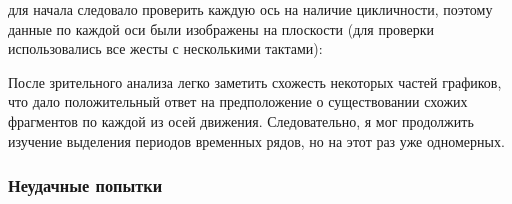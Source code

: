 для начала следовало проверить каждую ось на наличие цикличности, поэтому данные по каждой оси были изображены на плоскости (для проверки использовались все жесты с несколькими тактами):
\begin{figure}[H]
\end{figure}

После зрительного анализа легко заметить схожесть некоторых частей графиков, что дало положительный ответ на предположение о существовании схожих фрагментов по каждой из осей движения. Следовательно, я мог продолжить изучение выделения периодов временных рядов, но на этот раз уже одномерных.

\subsubsection{Неудачные попытки}

